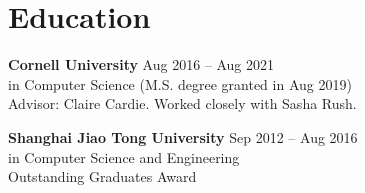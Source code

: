 \vspace{-1mm}
\section{Education}
% 
% 
\noindent \textbf{Cornell University}  \hfill Aug 2016 -- Aug 2021\\
{} in Computer Science ({M.S.} degree granted in Aug 2019) \\
\indent Advisor: Claire Cardie. Worked closely with Sasha Rush.

\noindent \textbf{Shanghai Jiao Tong University} \hfill Sep 2012 -- Aug 2016 \\
 in Computer Science and Engineering \\
\indent Outstanding Graduates Award \\